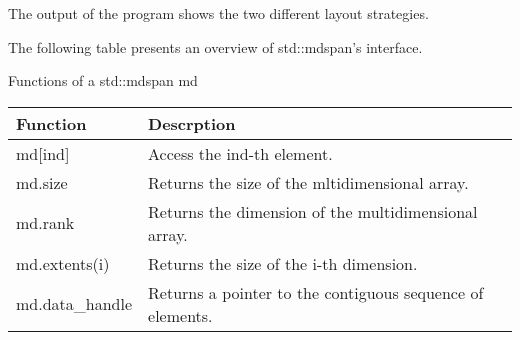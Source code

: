 The output of the program shows the two different layout strategies.


The following table presents an overview of std::mdspan’s interface.

\begin{center}
Functions of a std::mdspan md
\end{center}

\begin{longtable}[c]{|l|l|}
\hline
\textbf{Function} & \textbf{Descrption}                                       \\ \hline
\endfirsthead
%
\endhead
%
md{[}ind{]}       & Access the ind-th element.                                \\ \hline
md.size           & Returns the size of the mltidimensional array.            \\ \hline
md.rank           & Returns the dimension of the multidimensional array.      \\ \hline
md.extents(i)     & Returns the size of the i-th dimension.                   \\ \hline
md.data\_handle   & Returns a pointer to the contiguous sequence of elements. \\ \hline
\end{longtable}


































